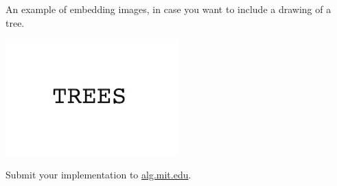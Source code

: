 \documentclass[12pt,twoside]{article}
\begin{document}


\begin{problems}

\problem  %

\begin{problemparts}
\problempart %
\problempart %
\end{problemparts}

\problem  %

\begin{problemparts}
\problempart %
An example of embedding images, in case you want to include a drawing of a tree.
\begin{center}
  \includegraphics[width=0.5\textwidth]{img.jpg}
\end{center}
\problempart %
\problempart %
\problempart %
\end{problemparts}

\newpage
\problem  %

\problem  %

\newpage
\problem  %

\begin{problemparts}
\problempart %
\problempart %
\problempart %
\problempart Submit your implementation to {\small\url{alg.mit.edu}}.
\end{problemparts}

\end{problems}
\end{document}
